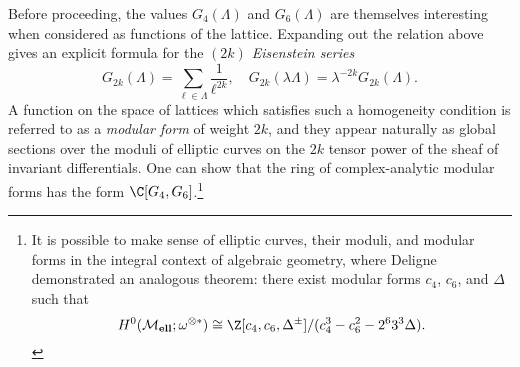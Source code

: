 \begin{remark}\label{MFRemark}
Before proceeding, the values \(G_4(\Lambda)\) and \(G_6(\Lambda)\) are themselves interesting when considered as functions of the lattice.  Expanding out the relation above gives an explicit formula for the \textit{\((2k)\){\th} Eisenstein series} \[G_{2k}(\Lambda) = \sum_{\ell \in \Lambda} \frac{1}{\ell^{2k}}, \quad G_{2k}(\lambda \Lambda) = \lambda^{-2k} G_{2k}(\Lambda).\]  A function on the space of lattices which satisfies such a homogeneity condition is referred to as a \textit{modular form} of weight \(2k\), and they appear naturally as global sections over the moduli of elliptic curves on the \(2k\){\th} tensor power of the sheaf of invariant differentials.  One can show that the ring of complex-analytic modular forms has the form \(\C[G_4, G_6]\).\footnote{It is possible to make sense of elliptic curves, their moduli, and modular forms in the integral context of algebraic geometry, where Deligne demonstrated an analogous theorem: there exist modular forms \(c_4\), \(c_6\), and \(\Delta\) such that \[H^0(\moduli{ell}; \omega^{\otimes *}) \cong \Z[c_4, c_6, \Delta^{\pm}] / (c_4^3 - c_6^2 - 2^6 3^3 \Delta).\]}
\end{remark}


